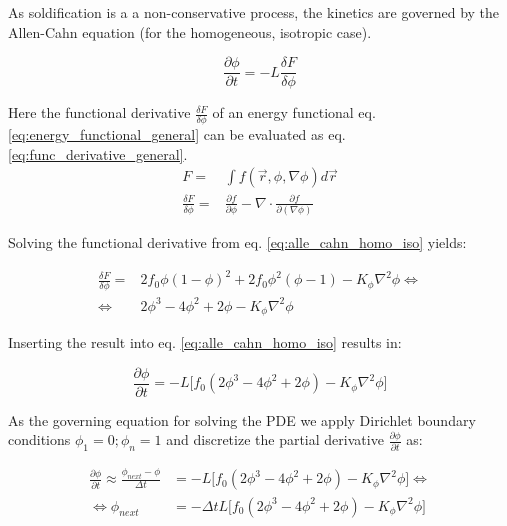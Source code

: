 As soldification is a a non-conservative process, the kinetics are governed by the Allen-Cahn equation (for the  homogeneous, isotropic case).

\begin{equation}
	\frac{\partial \phi}{\partial t} =-L \frac{\delta F}{\delta \phi} \label{eq:alle_cahn_homo_iso}
\end{equation}

Here the functional derivative \(\frac{\delta F}{\delta \phi}\) of an energy functional eq. \ref{eq:energy_functional_general} can be evaluated as eq. \ref{eq:func_derivative_general}.\\


\begin{subequations}
	\begin{align}
		F =& \int f(\vec{r}, \phi, \nabla \phi) d\vec{r} \label{eq:energy_functional_general} \\
		\frac{\delta F}{\delta \phi} =& \frac{\partial f}{ \partial \phi} - \nabla \cdot \frac{\partial f}{\partial (\nabla \phi)} \label{eq:func_derivative_general}
		\end{align}
\end{subequations}

Solving the functional derivative from eq. \ref{eq:alle_cahn_homo_iso} yields:

\begin{subequations}
	\begin{align}
		\frac{\delta F}{\delta \phi} =& 2 f_{0}\phi (1-\phi)^2 + 2 f_{0}\phi^{2} (\phi -1) - K_{\phi} \nabla^{2} \phi \Leftrightarrow \\
		\Leftrightarrow  & 2\phi^{3}  -4\phi^{2} + 2\phi - K_{\phi} \nabla^{2} \phi
	\end{align}
\end{subequations}

Inserting the result into eq. \ref{eq:alle_cahn_homo_iso} results in:

\begin{equation}
	\frac{\partial \phi}{\partial t} = -L \bigl[  f_0 ( 2\phi^{3} -4\phi^{2} + 2\phi) - K_{\phi} \nabla^{2} \phi \bigr]
\end{equation}

As the governing equation for solving the PDE we apply Dirichlet boundary conditions \(\phi_{1} = 0; \phi_{n}=1\) and discretize the partial derivative \(\frac{\partial \phi}{\partial t}\) as:

\begin{subequations}
	\begin{align}
	\frac{\partial \phi}{\partial t}  \approx \frac{\phi_{next} - \phi}{\Delta t} &=  -L \bigl[  f_0 ( 2\phi^{3} -4\phi^{2} + 2\phi) - K_{\phi} \nabla^{2} \phi \bigr] \Leftrightarrow \\
	\Leftrightarrow \phi_{next} & = -\Delta t L \bigl[  f_0 ( 2\phi^{3} -4\phi^{2} + 2\phi) - K_{\phi} \nabla^{2} \phi \bigr]
    \end{align}
\end{subequations}

